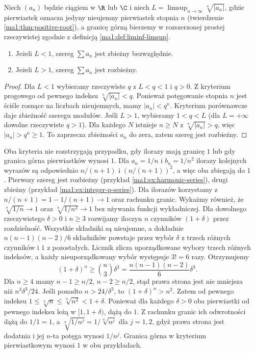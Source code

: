 \begin{twierdzenie}
\label{ma1:thm:root-test}
Niech $(a_n)$ będzie ciągiem w $\R$ lub $\C$ i niech
$L=\limsup_{n\to\infty}\sqrt[n]{|a_n|}$, gdzie pierwiastek oznacza jedyny nieujemny pierwiastek stopnia $n$ (twierdzenie \ref{ma1:thm:positive-root}), a granicę górną bierzemy w rozszerzonej prostej rzeczywistej zgodnie z definicją \ref{ma1:def:liminf-limsup}.
\begin{enumerate}[label=(\roman*)]
\item Jeżeli $L<1$, szereg $\sum a_n$ jest zbieżny bezwzględnie.
\item Jeżeli $L>1$, szereg $\sum a_n$ jest rozbieżny.
\end{enumerate}
\end{twierdzenie}
\begin{proof}
Dla $L<1$ wybieramy rzeczywiste $q$ z $L<q<1$ i $q>0$. Z kryterium progowego od pewnego indeksu $\sqrt[n]{|a_n|}<q$. Ponieważ potęgowanie stopnia $n$ jest ściśle rosnące na liczbach nieujemnych, mamy $|a_n|<q^n$. Kryterium porównawcze daje zbieżność szeregu modułów.
Jeśli $L>1$, wybieramy $1<q<L$ (dla $L=+\infty$ dowolne rzeczywiste $q>1$). Dla każdego $N$ istnieje $n\ge N$ z $\sqrt[n]{|a_n|}>q$, więc $|a_n|>q^n\ge1$. To zaprzecza zbieżności $a_n$ do zera, zatem szereg jest rozbieżny.
\end{proof}
\begin{przyklad}
\label{ma1:ex:ratio-root-boundary}
Oba kryteria nie rozstrzygają przypadku, gdy ilorazy mają granicę $1$ lub gdy granica górna pierwiastków wynosi $1$. Dla $a_n=1/n$ i $b_n=1/n^2$ ilorazy kolejnych wyrazów są odpowiednio $n/(n+1)$ i $(n/(n+1))^2$, a więc oba zbiegają do $1$. Pierwszy szereg jest rozbieżny (przykład \ref{ma1:ex:harmonic-series}), drugi zbieżny (przykład \ref{ma1:ex:integer-p-series}). Dla ilorazów korzystamy z $n/(n+1)=1-1/(n+1)\to1$ oraz rachunku granic.
Wykażmy również, że $\sqrt[n]{1/n}\to1$ oraz $\sqrt[n]{1/n^2}\to1$ bez używania funkcji wykładniczej. Dla dowolnego rzeczywistego $\delta>0$ i $n\ge3$ rozwijamy iloczyn $n$ czynników $(1+\delta)$ przez rozdzielność. Wszystkie składniki są nieujemne, a dokładnie $n(n-1)(n-2)/6$ składników powstaje przez wybór $\delta$ z trzech różnych czynników i $1$ z pozostałych. Licznik zlicza uporządkowane wybory trzech różnych indeksów, a każdy nieuporządkowany wybór występuje $3!=6$ razy. Otrzymujemy
\[
 (1+\delta)^n\ge \binom n3\delta^3
 =\frac{n(n-1)(n-2)}6\delta^3.
\]
Dla $n\ge4$ mamy $n-1\ge n/2$, $n-2\ge n/2$, stąd prawa strona jest nie mniejsza niż $n^3\delta^3/24$. Jeśli ponadto $n>24/\delta^3$, to $(1+\delta)^n>n^2$. Zatem od pewnego indeksu
$1\le\sqrt[n]{n}\le\sqrt[n]{n^2}<1+\delta$.
Ponieważ dla każdego $\delta>0$ oba pierwiastki od pewnego indeksu leżą w $[1,1+\delta)$, dążą do $1$. Z rachunku granic ich odwrotności dążą do $1/1=1$, a $\sqrt[n]{1/n^j}=1/\sqrt[n]{n^j}$ dla $j=1,2$, gdyż prawa strona jest dodatnia i jej $n$-ta potęga wynosi $1/n^j$. Granica górna w kryterium pierwiastkowym wynosi $1$ w obu przykładach.
\end{przyklad}
